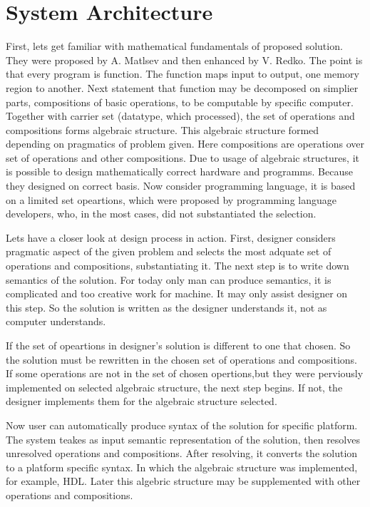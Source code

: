 \section{System Architecture}
First, lets get familiar with mathematical fundamentals of proposed solution. They were proposed by A. Matlsev\cite{maltsevalgebra} and then enhanced by V. Redko\cite{redko}. The point is that every program is function. The function maps input to output, one memory region to another. Next statement that function may be decomposed on simplier parts, compositions of basic operations, to be computable by specific computer. Together with carrier set (datatype, which processed), the set of operations and compositions forms algebraic structure. This algebraic structure formed depending on pragmatics of problem given. Here compositions are operations over set of operations and other compositions. Due to usage of algebraic structures, it is possible to design mathematically correct hardware and programms. Because they designed on correct basis. Now consider programming language, it is based on a limited set opeartions, which were proposed by programming language developers, who, in the most cases, did not substantiated the selection.

Lets have a closer look at design process in action. First, designer considers pragmatic aspect of the given problem and selects the most adquate set of operations and compositions, substantiating it. The next step is to write down semantics of the solution. For today only man can produce semantics, it is complicated and too creative work for machine. It may only assist designer on this step. So the solution is written as the designer understands it, not as computer understands.

If the set of opeartions in designer's solution is different to one that chosen. So the solution must be rewritten in the chosen set of operations and compositions. If some operations are not in the set of chosen opertions,but they were perviously implemented on selected algebraic structure, the next step begins. If not, the designer implements them for the algebraic structure selected. 

Now user can automatically produce syntax of the solution for specific platform. The system teakes as input semantic representation of the solution, then resolves unresolved operations and compositions. After resolving, it converts the solution to a platform specific syntax. In which the algebraic structure was implemented, for example, HDL. Later this algebric structure may be supplemented with other operations and compositions.

